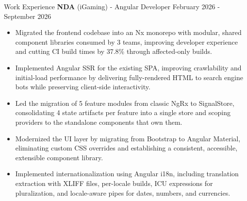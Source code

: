 \documentclass{resume}
\begin{document}
\vspace{-2mm}
\begin{rSection}{Work Experience}
 {\fontsize{12pt}{14pt}\selectfont \bf NDA}{ (iGaming) - Angular Developer} \hfill {February 2026 -          September 2026} \\
    \vspace{-6mm}
    \begin{itemize} \itemsep -4pt
        \item Migrated the frontend codebase into an Nx monorepo with modular, shared component libraries consumed by 3 teams, improving developer experience and cutting CI build times by 37.8\% through affected-only builds.
        \item Implemented Angular SSR for the existing SPA, improving crawlability and initial-load performance by delivering fully-rendered HTML to search engine bots while preserving client-side interactivity.
        \item Led the migration of 5 feature modules from classic NgRx to SignalStore, consolidating 4 state artifacts per feature into a single store and scoping providers to the standalone components that own them.
        \item Modernized the UI layer by migrating from Bootstrap to Angular Material, eliminating custom CSS overrides and establishing a consistent, accessible, extensible component library.
        \item Implemented internationalization using Angular i18n, including translation extraction with XLIFF files, per-locale builds, ICU expressions for pluralization, and locale-aware pipes for dates, numbers, and currencies.
     \end{itemize}
     \vspace{2mm}

    \vspace{-2mm}


\end{rSection}
\end{document}
